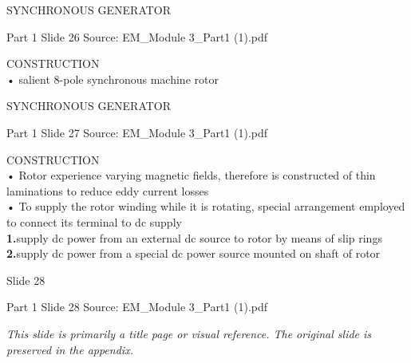\documentclass[11pt,a4paper]{article}
\begin{document}
\begin{mdframed}[roundcorner=9pt,backgroundcolor=white,linecolor=anthBlue,linewidth=1pt,innerleftmargin=12pt,innerrightmargin=12pt,innertopmargin=10pt,innerbottommargin=10pt,skipabove=8pt,skipbelow=10pt]
{\HeadingFont\fontsize{15}{18}\selectfont\color{anthDark}SYNCHRONOUS GENERATOR\par}
{\color{anthMid}\small Part 1 \textbullet{} Slide 26 \textbullet{} Source: EM\_Module 3\_Part1 (1).pdf\par}
\vspace{0.5em}
{\small
CONSTRUCTION\\
• salient 8-pole synchronous machine rotor\\

}
\end{mdframed}

\begin{mdframed}[roundcorner=9pt,backgroundcolor=white,linecolor=anthGreen,linewidth=1pt,innerleftmargin=12pt,innerrightmargin=12pt,innertopmargin=10pt,innerbottommargin=10pt,skipabove=8pt,skipbelow=10pt]
{\HeadingFont\fontsize{15}{18}\selectfont\color{anthDark}SYNCHRONOUS GENERATOR\par}
{\color{anthMid}\small Part 1 \textbullet{} Slide 27 \textbullet{} Source: EM\_Module 3\_Part1 (1).pdf\par}
\vspace{0.5em}
{\small
CONSTRUCTION\\
• Rotor experience varying magnetic fields, therefore is constructed of thin laminations to reduce eddy current losses\\
• To supply the rotor winding while it is rotating, special arrangement employed to connect its terminal to dc supply\\
\textcolor{anthGreen}{\textbf{1.}}\hspace{0.5em}supply dc power from an external dc source to rotor by means of slip rings\\
\textcolor{anthGreen}{\textbf{2.}}\hspace{0.5em}supply dc power from a special dc power source mounted on shaft of rotor\\

}
\end{mdframed}

\begin{mdframed}[roundcorner=9pt,backgroundcolor=white,linecolor=anthOrange,linewidth=1pt,innerleftmargin=12pt,innerrightmargin=12pt,innertopmargin=10pt,innerbottommargin=10pt,skipabove=8pt,skipbelow=10pt]
{\HeadingFont\fontsize{15}{18}\selectfont\color{anthDark}Slide 28\par}
{\color{anthMid}\small Part 1 \textbullet{} Slide 28 \textbullet{} Source: EM\_Module 3\_Part1 (1).pdf\par}
\vspace{0.5em}
{\small
\textit{This slide is primarily a title page or visual reference. The original slide is preserved in the appendix.}

}
\end{mdframed}
\end{document}
